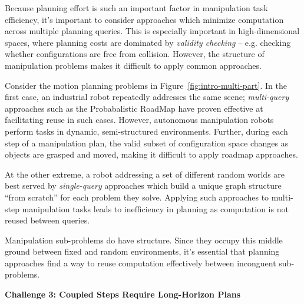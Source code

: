 Because planning effort is such an important factor in
manipulation task efficiency,
it's important to consider approaches which minimize computation
across multiple planning queries.
This is especially important in high-dimensional spaces,
where planning costs are dominated by \emph{validity checking} --
e.g. checking whether configurations are free from collision.
However, the structure of manipulation problems
makes it difficult to apply common approaches.

Consider the motion planning problems in
Figure~\ref{fig:intro-multi-part}.
In the first case,
an industrial robot repeatedly addresses the same scene;
\emph{multi-query} approaches such as the
Probabalistic RoadMap\cite{kavrakietal1996prm}
have proven effective at facilitating reuse in such cases.
However,
autonomous manipulation robots perform tasks
in dynamic, semi-structured environments.
Further,
during each step of a manipulation plan,
the valid subset of configuration space changes
as objects are grasped and moved,
making it difficult to apply roadmap approaches.

At the other extreme,
a robot addressing a set of different random worlds
are best served by \emph{single-query} approaches
which build a unique graph structure ``from scratch''
for each problem they solve.
Applying such approaches to multi-step manipulation tasks
leads to inefficiency in planning
as computation is not reused between queries.

Manipulation sub-problems do have structure.
Since they occupy this middle ground between
fixed and random environments,
it's essential that planning approaches
find a way to reuse computation effectively
between inconguent sub-problems.

\vspace{0.1in}
\noindent
\textbf{Challenge 3: Coupled Steps Require Long-Horizon Plans}


